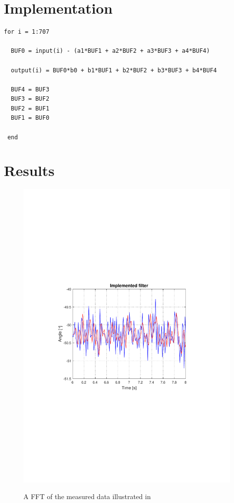 \section{Implementation}


\begin{lstlisting}
for i = 1:707

  BUF0 = input(i) - (a1*BUF1 + a2*BUF2 + a3*BUF3 + a4*BUF4)
	
  output(i) = BUF0*b0 + b1*BUF1 + b2*BUF2 + b3*BUF3 + b4*BUF4
    	
  BUF4 = BUF3
  BUF3 = BUF2
  BUF2 = BUF1
  BUF1 = BUF0
    
 end
\end{lstlisting}

\section{Results}

\begin{figure}[H]
  \centering
  {
    \includegraphics[width=1.1\textwidth]{figures/ImplementedFilter.pdf}
  }
  \caption{A FFT of the measured data illustrated in }
  \label{fig:discretetimebodeplot}
\end{figure}
